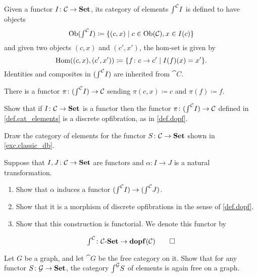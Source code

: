 \documentclass[Book-Poly]{subfiles}
\begin{document}
\begin{definition}\label{def.cat_elements}
Given a functor $I\colon\mathcal{C}\to\mathbf{Set}$, its category of elements $\textstyle{\int}^{\mathcal{C}}I$ is defined to have objects
\[
\operatorname{Ob}(\textstyle{\int}^{\mathcal{C}}I)\coloneqq\{(c,x)\mid c\in\operatorname{Ob}(\mathcal{C}), x\in I(c)\}
\]
and given two objects $(c,x)$ and $(c',x')$, the hom-set is given by
\[
\operatorname{Hom}((c,x),(c',x'))\coloneqq\{f\colon c\to c'\mid I(f)(x)=x'\}.
\]
Identities and composites in $(\textstyle{\int}^{\mathcal{C}}I)$ are inherited from $\cat{C}$.

There is a functor $\pi\colon(\textstyle{\int}^{\mathcal{C}}I)\to\mathcal{C}$ sending $\pi(c,x)\coloneqq c$ and $\pi(f)\coloneqq f$.
\end{definition}

\begin{exercise}
Show that if $I\colon\mathcal{C}\to\mathbf{Set}$ is a functor then the functor $\pi\colon(\textstyle{\int}^{\mathcal{C}}I)\to\mathcal{C}$ defined in \cref{def.cat_elements} is a discrete opfibration, as in \cref{def.dopf}.
\end{exercise}

\begin{exercise}
Draw the category of elements for the functor $S\colon\mathcal{C}\to\mathbf{Set}$ shown in \cref{exc.classic_db}.
\end{exercise}

\begin{exercise}\label{exc.elts_functor}
Suppose that $I,J\colon\mathcal{C}\to\mathbf{Set}$ are functors and $\alpha\colon I\to J$ is a natural transformation. 
\begin{enumerate}
	\item Show that $\alpha$ induces a functor $(\textstyle{\int}^{\mathcal{C}}I)\to(\textstyle{\int}^{\mathcal{C}}J)$.
	\item Show that it is a morphism of discrete opfibrations in the sense of \cref{def.dopf}.
	\item Show that this construction is functorial. We denote this functor by
\end{enumerate}
	\[
	\textstyle{\int}^{\mathcal{C}}\colon\mathcal{C}\textnormal{-}\mathbf{Set}\to\mathbf{dopf}(\mathcal{C})
\qedhere	
	\]
\end{exercise}

\begin{exercise}\label{exc.elts_free_grph}
Let $G$ be a graph, and let $\cat{G}$ be the free category on it. Show that for any functor $S\colon\mathcal{G}\to\mathbf{Set}$, the category $\textstyle{\int}^{\mathcal{G}} S$ of elements is again free on a graph.
\end{exercise}
\end{document}
